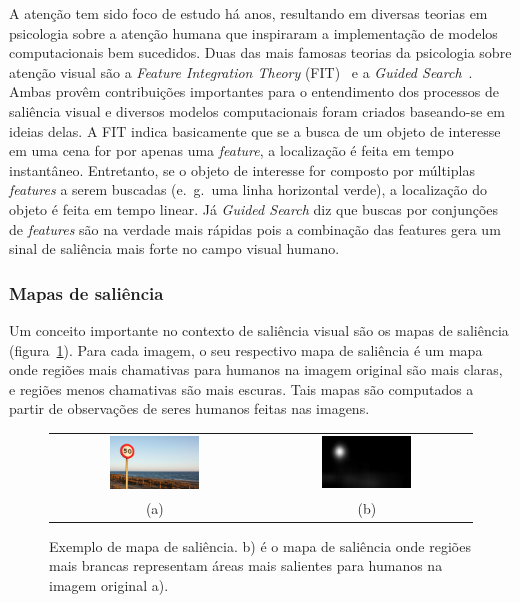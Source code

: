 \documentclass[11pt]{article}
\newcommand{\tit}[1]{\textit{#1}}
\newcommand{\eg}{e.~g.~}
\begin{document}
A atenção tem sido foco de estudo há anos, resultando em diversas teorias
em psicologia sobre a atenção humana que inspiraram a implementação de
modelos computacionais bem sucedidos.
Duas das mais famosas teorias da psicologia sobre atenção visual
são a \tit{Feature Integration Theory} (FIT)~\cite{TreismanGelade1980} e a
\tit{Guided Search}~\cite{Wolfe1989}.
Ambas provêm contribuições importantes para o entendimento dos processos
de saliência visual
e diversos modelos computacionais foram criados baseando-se em ideias delas.
A FIT indica basicamente que se a busca de um objeto de interesse em uma
cena for por apenas uma \tit{feature}, a localização é feita em tempo
instantâneo.
Entretanto, se o objeto de interesse for composto por múltiplas \tit{features}
a serem buscadas (\eg uma linha horizontal verde),
a localização do objeto é feita em tempo linear.
Já \tit{Guided Search} diz que buscas por conjunções de \tit{features} são na
verdade mais rápidas pois a combinação das features gera um sinal de
saliência mais forte no campo visual humano.

\subsubsection{Mapas de saliência}
Um conceito importante no contexto de saliência visual são os mapas
de saliência (figura~\ref{fig:salmap}).
Para cada imagem, o seu respectivo mapa de saliência é um mapa onde
regiões mais chamativas para humanos na imagem original são mais claras,
e regiões menos chamativas são mais escuras.
Tais mapas são computados a partir de observações de seres humanos feitas
nas imagens.

\begin{figure}[H]
\begin{center}
		\begin{tabular} {cc}
		\includegraphics[width=0.45\textwidth]{./img/traffic_sign_s.jpg} &
		\includegraphics[width=0.45\textwidth]{./img/traffic_sign_m.jpg}\\
        (a) & (b)
		\end{tabular}
\end{center}
\caption{Exemplo de mapa de saliência. b) é o mapa de saliência onde 
    regiões mais brancas representam áreas
    mais salientes para humanos na imagem original a).}
\label{fig:salmap}
\end{figure}
\end{document}
